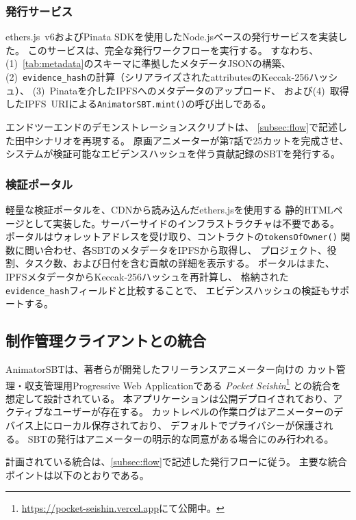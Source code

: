 \subsubsection{発行サービス}

ethers.js~v6およびPinata SDKを使用したNode.jsベースの発行サービスを実装した。
このサービスは、完全な発行ワークフローを実行する。
すなわち、(1)~\cref{tab:metadata}のスキーマに準拠したメタデータJSONの構築、
(2)~\texttt{evidence\_hash}の計算（シリアライズされたattributesのKeccak-256ハッシュ）、
(3)~Pinataを介したIPFSへのメタデータのアップロード、
および(4)~取得したIPFS~URIによる\texttt{AnimatorSBT.mint()}の呼び出しである。

エンドツーエンドのデモンストレーションスクリプトは、
\cref{subsec:flow}で記述した田中シナリオを再現する。
原画アニメーターが第7話で25カットを完成させ、
システムが検証可能なエビデンスハッシュを伴う貢献記録のSBTを発行する。

\subsubsection{検証ポータル}

軽量な検証ポータルを、CDNから読み込んだethers.jsを使用する
静的HTMLページとして実装した。サーバーサイドのインフラストラクチャは不要である。
ポータルはウォレットアドレスを受け取り、コントラクトの\texttt{tokensOfOwner()}
関数に問い合わせ、各SBTのメタデータをIPFSから取得し、
プロジェクト、役割、タスク数、および日付を含む貢献の詳細を表示する。
ポータルはまた、IPFSメタデータからKeccak-256ハッシュを再計算し、
格納された\texttt{evidence\_hash}フィールドと比較することで、
エビデンスハッシュの検証もサポートする。

\subsection{制作管理クライアントとの統合}
\label{subsec:integration}

AnimatorSBTは、著者らが開発したフリーランスアニメーター向けの
カット管理・収支管理用Progressive Web Applicationである
\textit{Pocket Seishin}\footnote{\url{https://pocket-seishin.vercel.app}にて公開中。}
との統合を想定して設計されている。
本アプリケーションは公開デプロイされており、アクティブなユーザーが存在する。
カットレベルの作業ログはアニメーターのデバイス上にローカル保存されており、
デフォルトでプライバシーが保護される。
SBTの発行はアニメーターの明示的な同意がある場合にのみ行われる。

計画されている統合は、\cref{subsec:flow}で記述した発行フローに従う。
主要な統合ポイントは以下のとおりである。

